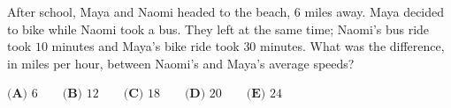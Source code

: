 After school, Maya and Naomi headed to the beach, $6$ miles away. Maya decided to bike while Naomi took a bus. They left at the same time; Naomi's bus ride took $10$ minutes and Maya's bike ride took $30$ minutes. What was the difference, in miles per hour, between Naomi's and Maya's average speeds?

$\textbf{(A) }6 \qquad \textbf{(B) }12 \qquad \textbf{(C) }18 \qquad \textbf{(D) }20 \qquad \textbf{(E) }24$
